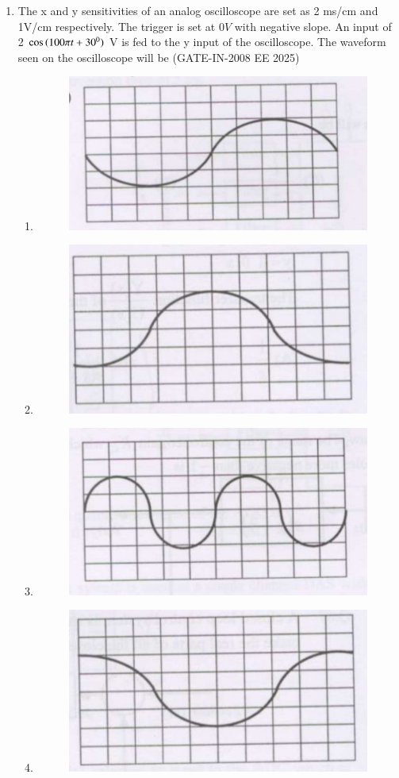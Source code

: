 \documentclass[journal,12pt,onecolumn]{IEEEtran}
\theoremstyle{remark}
\begin{document}
\begin{enumerate}[label=Q.\arabic*,start=1]
\item  The x and y sensitivities of an analog oscilloscope are set as 2 ms/cm and 1V/cm respectively. The
trigger is set at $0 V$ with negative slope. An input of 2 $\cos{(100{\pi}t + 30\textsuperscript{0})}$ V is fed to the y input of
the oscilloscope. The waveform seen on the oscilloscope will be (GATE-IN-2008 EE 2025)
           \begin{enumerate} 
              \item  
              \begin{figure}[H]
    \centering
    \includegraphics[width=0.5\linewidth]{figs/i25.jpg}
    \label{fig:placeholder25}
\end{figure}
              \item
              \begin{figure}[H]
    \centering
    \includegraphics[width=0.5\linewidth]{figs/i26.jpg}
    \label{fig:placeholder26}
\end{figure}
              \item
              \begin{figure}[H]
    \centering
    \includegraphics[width=0.5\linewidth]{figs/i27.jpg}
    \label{fig:placeholder27}
\end{figure}
              \item
              \begin{figure}[H]
    \centering
    \includegraphics[width=0.5\linewidth]{figs/i28.jpg}
    \label{fig:placeholder28}
\end{figure}
            \end{enumerate}


\end{enumerate}
\end{document}
